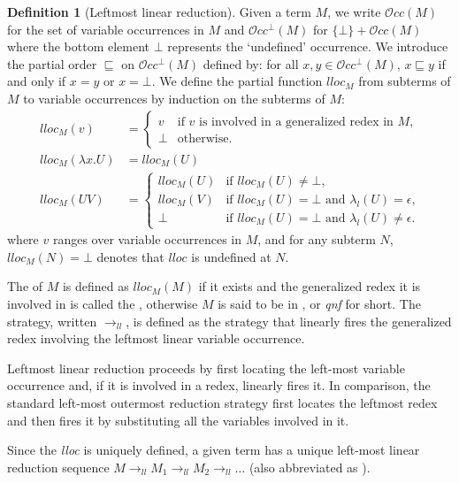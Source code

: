 \documentclass{elsarticle}
\theoremstyle{plain}
\theoremstyle{definition}
\newtheorem{definition}{Definition}[section]
\newcommand\VarOcc{\mathcal{O}{cc}}
\newcommand{\llred}{\rightarrow_{ll}}
\begin{document}
\begin{definition}[Leftmost linear reduction]
    \label{def:leftmostlinearreduction}
Given a term $M$, we write $\VarOcc(M)$ for the set of variable occurrences in $M$
and $\VarOcc^\bot(M)$ for $\{\bot \} + \VarOcc(M)$ where the bottom element $\bot$ represents the `undefined' occurrence. We introduce the partial order $\sqsubseteq$ on $\VarOcc^\bot(M)$ defined by: for all $x,y \in \VarOcc^\bot(M)$, $x \sqsubseteq y$ if and only if $x = y$ or $x = \bot$. We define the partial function $lloc_M$ from subterms of $M$ to variable occurrences by induction on the subterms of $M$:
\begin{align*}
lloc_M(v) &=
    \begin{cases}
    v &\mbox{if $v$ is involved in a generalized redex in $M$,} \\
    \bot & \mbox {otherwise.}
    \end{cases}  \\
lloc_M(\lambda x . U) &= lloc_M(U) \\
lloc_M(U V) &= \begin{cases}
                lloc_M(U) &\mbox{if $lloc_M(U)\neq\bot$,} \\
                lloc_M(V) &\mbox{if $lloc_M(U)=\bot$ and $\lambda_l(U) = \epsilon$,} \\
                \bot & \mbox{if $lloc_M(U)=\bot$ and $\lambda_l(U) \neq \epsilon$.}
              \end{cases}
\end{align*}
where $v$ ranges over variable occurrences in $M$,
and for any subterm $N$, $lloc_M(N) = \bot$ denotes that $lloc$ is undefined at $N$.

The  of $M$
is defined as $lloc_M(M)$ if it exists and the generalized redex it is involved in is called the , otherwise $M$ is said to be in , or \emph{qnf} for short.
The  strategy, written $\llred$, is defined as the strategy that linearly fires the generalized redex involving the leftmost linear variable occurrence.
\end{definition}
Leftmost linear reduction proceeds by first locating the left-most variable occurrence and, if it is involved in a redex, linearly fires it. In comparison, the standard left-most outermost reduction strategy first locates the leftmost redex and then fires it by substituting all the variables involved in it.

Since the \emph{lloc} is uniquely defined, a given term has a unique left-most linear reduction sequence $M \llred M_1 \llred M_2 \llred \ldots$ (also abbreviated as ).
\end{document}
